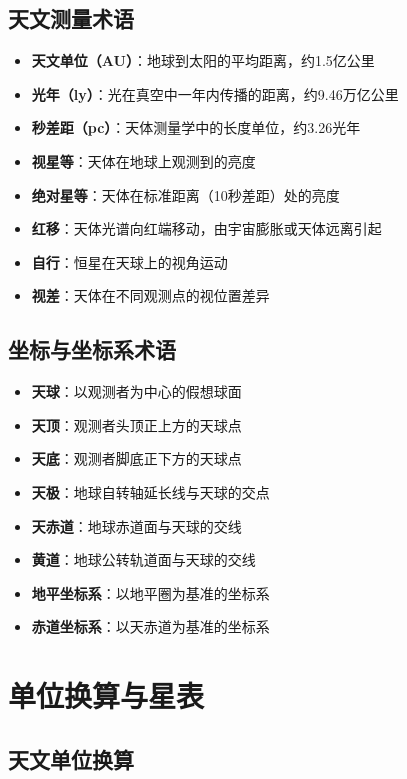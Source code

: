 \documentclass[12pt,UTF8]{ctexbook}
\begin{document}
\section{天文测量术语}

\begin{itemize}
  \item \textbf{天文单位（AU）}：地球到太阳的平均距离，约1.5亿公里
  \item \textbf{光年（ly）}：光在真空中一年内传播的距离，约9.46万亿公里
  \item \textbf{秒差距（pc）}：天体测量学中的长度单位，约3.26光年
  \item \textbf{视星等}：天体在地球上观测到的亮度
  \item \textbf{绝对星等}：天体在标准距离（10秒差距）处的亮度
  \item \textbf{红移}：天体光谱向红端移动，由宇宙膨胀或天体远离引起
  \item \textbf{自行}：恒星在天球上的视角运动
  \item \textbf{视差}：天体在不同观测点的视位置差异
\end{itemize}

\section{坐标与坐标系术语}

\begin{itemize}
  \item \textbf{天球}：以观测者为中心的假想球面
  \item \textbf{天顶}：观测者头顶正上方的天球点
  \item \textbf{天底}：观测者脚底正下方的天球点
  \item \textbf{天极}：地球自转轴延长线与天球的交点
  \item \textbf{天赤道}：地球赤道面与天球的交线
  \item \textbf{黄道}：地球公转轨道面与天球的交线
  \item \textbf{地平坐标系}：以地平圈为基准的坐标系
  \item \textbf{赤道坐标系}：以天赤道为基准的坐标系
\end{itemize}

\chapter{单位换算与星表}
\section{天文单位换算}
\end{document}
